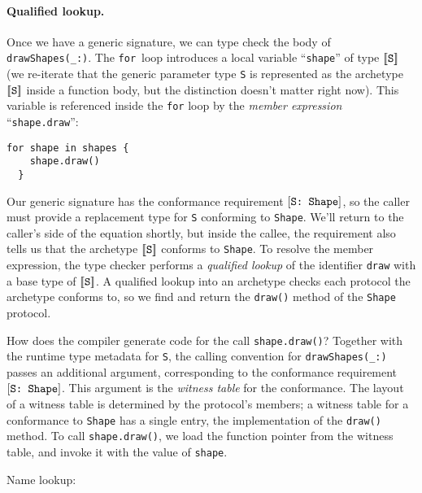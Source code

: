 \documentclass[../generics]{subfiles}
\begin{document}
\paragraph{Qualified  lookup.}
Once we have a generic signature, we can type check the body of \verb|drawShapes(_:)|. The \texttt{for}~loop introduces a local variable ``\texttt{shape}'' of type $[\![\texttt{S}]\!]$ (we re-iterate that the generic parameter type \texttt{S} is represented as the archetype $[\![\texttt{S}]\!]$ inside a function body, but the distinction doesn't matter right now). This variable is referenced inside the \texttt{for} loop by the \emph{member expression} ``\texttt{shape.draw}'':
\begin{Verbatim}[firstnumber=6]
  for shape in shapes {
    shape.draw()
  }
\end{Verbatim}

Our generic signature has the conformance requirement $[\texttt{S:~Shape}]$, so the caller must provide a replacement type for \texttt{S} conforming to \texttt{Shape}. We'll return to the caller's side of the equation shortly, but inside the callee, the requirement also tells us that the archetype $[\![\texttt{S}]\!]$ conforms to \texttt{Shape}. To resolve the member expression, the type checker performs a \emph{qualified lookup} of the identifier \texttt{draw} with a base type of $[\![\texttt{S}]\!]$. A qualified lookup into an archetype checks each protocol the archetype conforms to, so we find and return the \texttt{draw()} method of the \texttt{Shape} protocol.

How does the compiler generate code for the call \verb|shape.draw()|? Together with the runtime type metadata for \texttt{S}, the calling convention for \verb|drawShapes(_:)| passes an additional argument, corresponding to the conformance requirement $[\texttt{S:~Shape}]$. This argument is the \emph{witness table} for the conformance. The layout of a witness table is determined by the protocol's members; a witness table for a conformance to \texttt{Shape} has a single entry, the implementation of the \texttt{draw()} method. To call \texttt{shape.draw()}, we load the function pointer from the witness table, and invoke it with the value of \texttt{shape}.

\begin{MoreDetails}
\item Name lookup: 
\end{MoreDetails}
\end{document}
